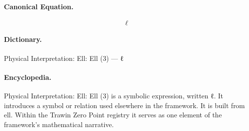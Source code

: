 \paragraph{Canonical Equation.}
\[
\ell
\]

\paragraph{Dictionary.}
Physical Interpretation: Ell: Ell (3) — ℓ

\paragraph{Encyclopedia.}
Physical Interpretation: Ell: Ell (3) is a symbolic expression, written ℓ. It introduces a symbol or relation used elsewhere in the framework. It is built from ell. Within the Trawin Zero Point registry it serves as one element of the framework's mathematical narrative.
